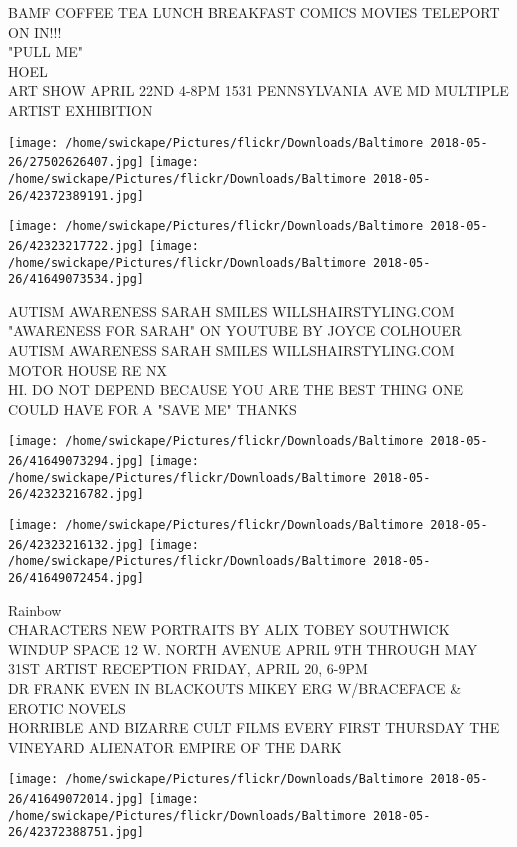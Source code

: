 \documentclass[10pt,letterpaper]{article}
\begin{document}
BAMF COFFEE TEA LUNCH BREAKFAST COMICS MOVIES TELEPORT ON IN!!!\\
"PULL ME"\\
HOEL\\
ART SHOW APRIL 22ND 4{-}8PM 1531 PENNSYLVANIA AVE MD MULTIPLE ARTIST EXHIBITION\\
\pagebreak

\texttt{[image: /home/swickape/Pictures/flickr/Downloads/Baltimore 2018-05-26/27502626407.jpg]}
\texttt{[image: /home/swickape/Pictures/flickr/Downloads/Baltimore 2018-05-26/42372389191.jpg]}

\texttt{[image: /home/swickape/Pictures/flickr/Downloads/Baltimore 2018-05-26/42323217722.jpg]}
\texttt{[image: /home/swickape/Pictures/flickr/Downloads/Baltimore 2018-05-26/41649073534.jpg]}

AUTISM AWARENESS SARAH SMILES WILLSHAIRSTYLING.COM "AWARENESS FOR SARAH" ON YOUTUBE BY JOYCE COLHOUER\\
AUTISM AWARENESS SARAH SMILES WILLSHAIRSTYLING.COM\\
MOTOR HOUSE RE NX\\
HI.  DO NOT DEPEND BECAUSE YOU ARE THE BEST THING ONE COULD HAVE FOR A "SAVE ME" THANKS\\
\pagebreak

\texttt{[image: /home/swickape/Pictures/flickr/Downloads/Baltimore 2018-05-26/41649073294.jpg]}
\texttt{[image: /home/swickape/Pictures/flickr/Downloads/Baltimore 2018-05-26/42323216782.jpg]}

\texttt{[image: /home/swickape/Pictures/flickr/Downloads/Baltimore 2018-05-26/42323216132.jpg]}
\texttt{[image: /home/swickape/Pictures/flickr/Downloads/Baltimore 2018-05-26/41649072454.jpg]}

Rainbow\\
CHARACTERS NEW PORTRAITS BY ALIX TOBEY SOUTHWICK WINDUP SPACE 12 W. NORTH AVENUE APRIL 9TH THROUGH MAY 31ST ARTIST RECEPTION FRIDAY, APRIL 20, 6{-}9PM\\
DR FRANK EVEN IN BLACKOUTS MIKEY ERG W/BRACEFACE \& EROTIC NOVELS\\
HORRIBLE AND BIZARRE CULT FILMS EVERY FIRST THURSDAY THE VINEYARD ALIENATOR EMPIRE OF THE DARK\\
\pagebreak

\texttt{[image: /home/swickape/Pictures/flickr/Downloads/Baltimore 2018-05-26/41649072014.jpg]}
\texttt{[image: /home/swickape/Pictures/flickr/Downloads/Baltimore 2018-05-26/42372388751.jpg]}
\end{document}
